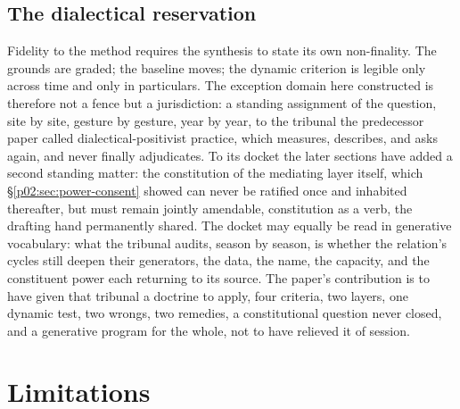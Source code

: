 \documentclass[11pt,a4paper]{article}
\begin{document}
\subsection{The dialectical reservation}
\label{p02:sec:implications-reservation}

Fidelity to the method requires the synthesis to state its own non-finality. The grounds are graded; the baseline moves; the dynamic criterion is legible only across time and only in particulars. The exception domain here constructed is therefore not a fence but a jurisdiction: a standing assignment of the question, site by site, gesture by gesture, year by year, to the tribunal the predecessor paper called dialectical-positivist practice, which measures, describes, and asks again, and never finally adjudicates. To its docket the later sections have added a second standing matter: the constitution of the mediating layer itself, which \S\ref{p02:sec:power-consent} showed can never be ratified once and inhabited thereafter, but must remain jointly amendable, constitution as a verb, the drafting hand permanently shared. The docket may equally be read in generative vocabulary: what the tribunal audits, season by season, is whether the relation's cycles still deepen their generators, the data, the name, the capacity, and the constituent power each returning to its source. The paper's contribution is to have given that tribunal a doctrine to apply, four criteria, two layers, one dynamic test, two wrongs, two remedies, a constitutional question never closed, and a generative program for the whole, not to have relieved it of session.

\section{Limitations}
\label{p02:sec:limits}
\end{document}
